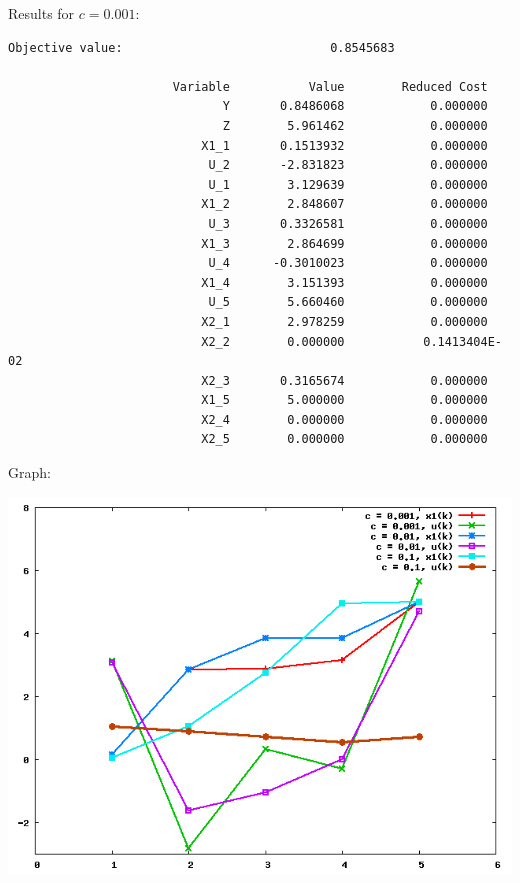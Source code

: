\documentclass{article}
\begin{document}
Results for $c = 0.001$:

\begin{verbatim}
Objective value:                             0.8545683

                       Variable           Value        Reduced Cost
                              Y       0.8486068            0.000000
                              Z        5.961462            0.000000
                           X1_1       0.1513932            0.000000
                            U_2       -2.831823            0.000000
                            U_1        3.129639            0.000000
                           X1_2        2.848607            0.000000
                            U_3       0.3326581            0.000000
                           X1_3        2.864699            0.000000
                            U_4      -0.3010023            0.000000
                           X1_4        3.151393            0.000000
                            U_5        5.660460            0.000000
                           X2_1        2.978259            0.000000
                           X2_2        0.000000           0.1413404E-02
                           X2_3       0.3165674            0.000000
                           X1_5        5.000000            0.000000
                           X2_4        0.000000            0.000000
                           X2_5        0.000000            0.000000
\end{verbatim}

Graph:

\includegraphics[width=\linewidth]{out}
\end{document}
